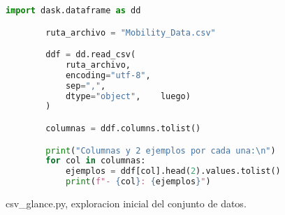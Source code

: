 \begin{figure}[H]
    \begin{lstlisting}[language=Python, breaklines=true]
        import dask.dataframe as dd

        ruta_archivo = "Mobility_Data.csv"  

        ddf = dd.read_csv(
            ruta_archivo,
            encoding="utf-8",  
            sep=",",          
            dtype="object",    luego)
        )

        columnas = ddf.columns.tolist()

        print("Columnas y 2 ejemplos por cada una:\n")
        for col in columnas:
            ejemplos = ddf[col].head(2).values.tolist() 
            print(f"- {col}: {ejemplos}")
    \end{lstlisting}
    \caption{csv\_glance.py, exploracion inicial del conjunto de datos.}
    \label{fig:csv_glance}
\end{figure}


